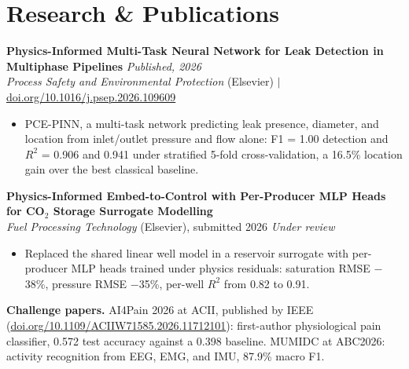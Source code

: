 \documentclass[10pt,a4paper]{article}
\begin{document}
\section*{Research \& Publications}
\textbf{Physics-Informed Multi-Task Neural Network for Leak Detection in Multiphase Pipelines} \hfill \textit{Published, 2026}\\[1pt]
\textit{Process Safety and Environmental Protection} (Elsevier) \enspace $|$ \enspace \href{https://doi.org/10.1016/j.psep.2026.109609}{doi.org/10.1016/j.psep.2026.109609}
\begin{itemize}
  \item PCE-PINN, a multi-task network predicting leak presence, diameter, and location from inlet/outlet pressure and flow alone: F1 = 1.00 detection and $R^2$ = 0.906 and 0.941 under stratified 5-fold cross-validation, a 16.5\% location gain over the best classical baseline.
\end{itemize}
\textbf{Physics-Informed Embed-to-Control with Per-Producer MLP Heads for CO$_2$ Storage Surrogate Modelling}\\[1pt]
\textit{Fuel Processing Technology} (Elsevier), submitted 2026 \hfill \textit{Under review}
\begin{itemize}
  \item Replaced the shared linear well model in a reservoir surrogate with per-producer MLP heads trained under physics residuals: saturation RMSE $-$38\%, pressure RMSE $-$35\%, per-well $R^2$ from 0.82 to 0.91.
\end{itemize}
\textbf{Challenge papers.} AI4Pain 2026 at ACII, published by IEEE (\href{https://doi.org/10.1109/ACIIW71585.2026.11712101}{doi.org/10.1109/ACIIW71585.2026.11712101}): first-author physiological pain classifier, 0.572 test accuracy against a 0.398 baseline. MUMIDC at ABC2026: activity recognition from EEG, EMG, and IMU, 87.9\% macro F1.
\end{document}
